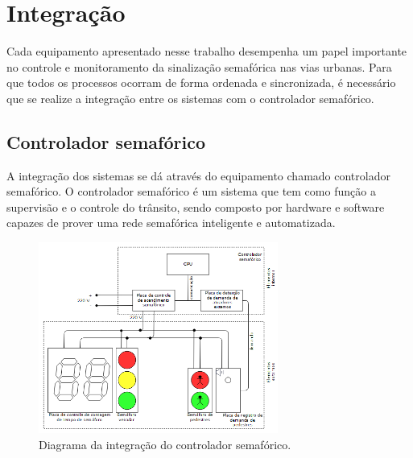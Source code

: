 \chapter{Integração}

Cada equipamento apresentado nesse trabalho desempenha um papel importante no controle e monitoramento da sinalização semafórica nas vias urbanas. Para que todos os processos ocorram de forma ordenada e sincronizada, é necessário que se realize a integração entre os sistemas com o controlador semafórico. 

\section{Controlador semafórico}

A integração dos sistemas se dá através do equipamento chamado controlador semafórico. O controlador semafórico é um sistema que tem como função a supervisão e o controle do trânsito, sendo composto por hardware e software capazes de prover uma rede semafórica inteligente e automatizada.

\begin{figure}[ht]
    \begin{center}
    \includegraphics[width=0.7\textwidth]{figuras/diagrama_controlador.PNG}
    \end{center}
    \caption[Controlador semafórico]{Diagrama da integração do controlador semafórico.}
    \label{controlador}
\end{figure}

